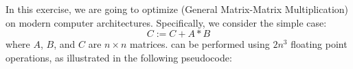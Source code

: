 In this exercise, we are going to optimize \Gemm{} (General Matrix-Matrix
Multiplication) on modern computer architectures.
Specifically, we consider the simple case:
$$C:=C+A*B$$
where $A$, $B$, and $C$ are $n\times n$ matrices. \Gemm{} can be performed using
$2n^3$ floating point operations, as illustrated in the following pseudocode:



